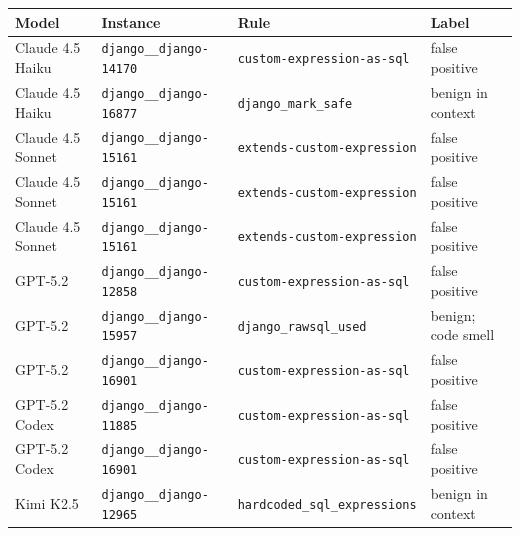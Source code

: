 \begin{tabular}{llll}
\toprule
Model & Instance & Rule & Label \\
\midrule
Claude 4.5 Haiku & \texttt{django\_\_django-14170} & \texttt{custom-expression-as-sql} & false positive \\
Claude 4.5 Haiku & \texttt{django\_\_django-16877} & \texttt{django\_mark\_safe} & benign in context \\
Claude 4.5 Sonnet & \texttt{django\_\_django-15161} & \texttt{extends-custom-expression} & false positive \\
Claude 4.5 Sonnet & \texttt{django\_\_django-15161} & \texttt{extends-custom-expression} & false positive \\
Claude 4.5 Sonnet & \texttt{django\_\_django-15161} & \texttt{extends-custom-expression} & false positive \\
GPT-5.2 & \texttt{django\_\_django-12858} & \texttt{custom-expression-as-sql} & false positive \\
GPT-5.2 & \texttt{django\_\_django-15957} & \texttt{django\_rawsql\_used} & benign; code smell \\
GPT-5.2 & \texttt{django\_\_django-16901} & \texttt{custom-expression-as-sql} & false positive \\
GPT-5.2 Codex & \texttt{django\_\_django-11885} & \texttt{custom-expression-as-sql} & false positive \\
GPT-5.2 Codex & \texttt{django\_\_django-16901} & \texttt{custom-expression-as-sql} & false positive \\
Kimi K2.5 & \texttt{django\_\_django-12965} & \texttt{hardcoded\_sql\_expressions} & benign in context \\
\bottomrule
\end{tabular}

